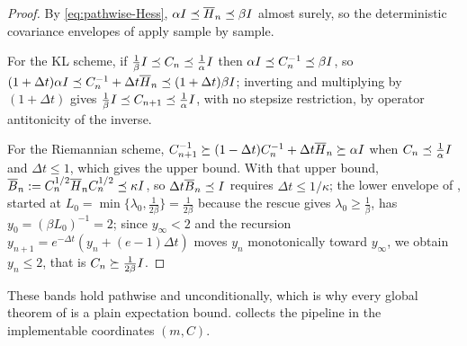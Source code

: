 \begin{proof}
By \eqref{eq:pathwise-Hess}, $\alpha I\preceq\overline H_n\preceq\beta I$ almost surely, so the
deterministic covariance envelopes of  apply sample by sample.

For the KL scheme, if $\tfrac1\beta I\preceq C_n\preceq\tfrac1\alpha I$ then
$\alpha I\preceq C_n^{-1}\preceq\beta I$, so
$(1+\Delta t)\alpha I\preceq C_n^{-1}+\Delta t\overline H_n\preceq(1+\Delta t)\beta I$; inverting and
multiplying by $(1+\Delta t)$ gives $\tfrac1\beta I\preceq C_{n+1}\preceq\tfrac1\alpha I$, with no
stepsize restriction, by operator antitonicity of the inverse.

For the Riemannian scheme, $C_{n+1}^{-1}\succeq(1-\Delta t)C_n^{-1}+\Delta t\overline H_n\succeq\alpha I$
when $C_n\preceq\tfrac1\alpha I$ and $\Delta t\leq1$, which gives the upper bound. With that upper
bound, $\overline B_n:=C_n^{1/2}\overline H_nC_n^{1/2}\preceq\kappa I$, so $\Delta t\overline B_n\preceq I$
requires $\Delta t\leq1/\kappa$; the lower envelope of , started at
$L_0=\min\{\lambda_0,\tfrac1{2\beta}\}=\tfrac1{2\beta}$ because the rescue gives
$\lambda_0\geq\tfrac1\beta$, has $y_0=(\beta L_0)^{-1}=2$; since $y_\infty<2$ and the recursion
$y_{n+1}=e^{-\Delta t}(y_n+(e-1)\Delta t)$ moves $y_n$ monotonically toward $y_\infty$, we obtain
$y_n\leq2$, that is $C_n\succeq\tfrac1{2\beta}I$.
\end{proof}

These bands hold pathwise and unconditionally, which is why every global theorem of
 is a plain expectation bound.  collects the pipeline in
the implementable coordinates $(m,C)$.

